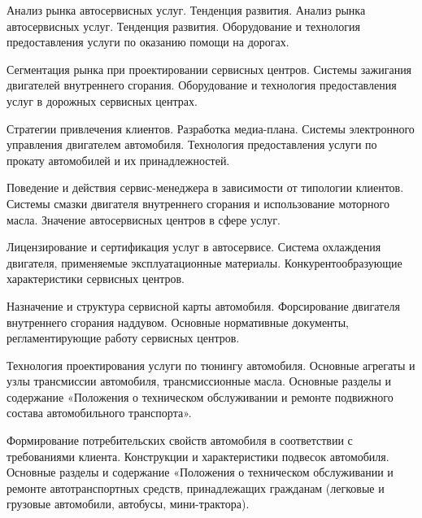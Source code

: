 \documentclass[
	11pt,
	a4paper,
	]
	{article}
\begin{document}
\bigskip

\noindent{} 
	{
		Анализ рынка автосервисных услуг. Тенденция развития.
	}{
		Анализ рынка автосервисных услуг. Тенденция развития.
	}{
		Оборудование и технология предоставления услуги по оказанию помощи на дорогах.
	}

\bigskip

\noindent{} 
	{
		Сегментация рынка при проектировании сервисных центров.
	}{
		Системы зажигания двигателей внутреннего сгорания.
	}{
		Оборудование и технология предоставления услуг в дорожных сервисных центрах.
	}

\bigskip

\noindent{} 
	{
		Стратегии привлечения клиентов. Разработка медиа-плана.
	}{
		Системы электронного управления двигателем автомобиля.
	}{
		Технология предоставления услуги по прокату автомобилей и их принадлежностей.
	}

\bigskip

\noindent{} 
	{
		Поведение и действия сервис-менеджера в зависимости от типологии клиентов.
	}{
		Системы смазки двигателя внутреннего сгорания и использование моторного масла.
	}{
		Значение автосервисных центров в сфере услуг.
	}

\bigskip

\noindent{} 
	{
		Лицензирование и сертификация услуг в автосервисе.
	}{
		Система охлаждения двигателя, применяемые эксплуатационные материалы.
	}{
		Конкурентообразующие характеристики сервисных центров.
	}

\bigskip

\noindent{} 
	{
		Назначение и структура сервисной карты автомобиля.
	}{
		Форсирование двигателя внутреннего сгорания наддувом.
	}{
		Основные нормативные документы, регламентирующие работу сервисных центров.
	}

\bigskip

\noindent{} 
	{
		Технология проектирования услуги по тюнингу автомобиля.
	}{
		Основные агрегаты и узлы трансмиссии автомобиля, трансмиссионные масла.
	}{
		Основные разделы и содержание «Положения о техническом обслуживании и ремонте подвижного состава автомобильного транспорта».
	}

\bigskip

\noindent{} 
	{
		Формирование потребительских свойств автомобиля в соответствии с требованиями клиента.
	}{
		Конструкции и характеристики подвесок автомобиля.
	}{
		Основные разделы и содержание «Положения о техническом обслуживании и ремонте автотранспортных средств, принадлежащих гражданам (легковые и грузовые автомобили, автобусы, мини-трактора).
	}
\end{document}
